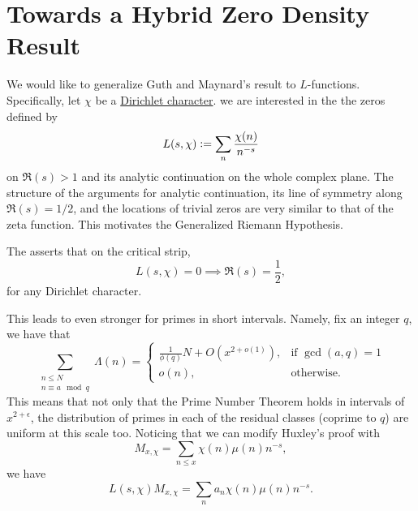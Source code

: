 \section{Towards a Hybrid Zero Density Result}
\iffalse

\textit{Here I will document some progress with working with
the hybrid version of Guth-Maynard. This section will be removed when I send the draft to Prof. Wunsch.}
\fi
We would like to generalize Guth and Maynard's result to $L$-functions. Specifically, let $\chi$ be a \hyperref[dcharacter]{Dirichlet character}. we are interested in the the zeros defined by \[
L(s,\chi)\mathrel{\mathop:}=\sum_{n} \frac{\chi(n)}{n^{-s}}
\]
on $\Re(s)>1$ and its analytic continuation on the whole complex plane. The structure of the arguments for analytic continuation, its line of symmetry along $\Re(s) = 1/2$, and the locations of trivial zeros are very similar to that of the zeta function. This motivates the Generalized Riemann Hypothesis. \begin{conjecture} 
    The  asserts that on the critical strip, \[
    L(s,\chi)=0 \implies \Re(s)=\frac{1}{2},
    \]
    for any Dirichlet character.
\end{conjecture}
This leads to even stronger for primes in short intervals. Namely, fix an integer $q$, we have that \[
\sum_{\substack{n\leq N\\ n\equiv a\mod q}}\Lambda(n) = \begin{cases}
    \frac{1}{\phi(q)} N + O(x^{2+o(1)}), & \textrm{if $\gcd(a,q)=1$}\\
    o(n),& \textrm{otherwise.}
\end{cases}
\]
This means that not only that the Prime Number Theorem holds in intervals of $x^{2+\epsilon}$, the distribution of primes in each of the residual classes (coprime to $q$) are uniform at this scale too. Noticing that we can modify Huxley's proof with \[
M_{x,\chi} = \sum_{n\leq x} \chi(n) \mu(n) n^{-s},
\]
we have \[
L(s,\chi)M_{x,\chi} = \sum_{n} a_n \chi(n) \mu(n) n^{-s}.
\]


